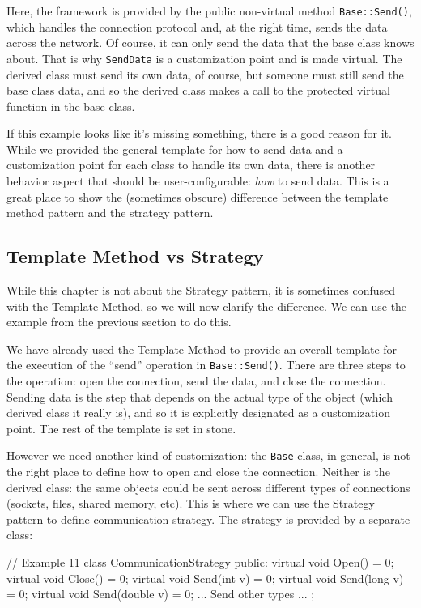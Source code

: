 Here, the framework is provided by the public non-virtual method \texttt{Base::Send()}, which handles the connection protocol and, at the right time, sends the data across the network. Of course, it can only send the data that the base class knows about. That is why \texttt{SendData} is a customization point and is made virtual. The derived class must send its own data, of course, but someone must still send the base class data, and so the derived class makes a call to the protected virtual function in the base class.

If this example looks like it's missing something, there is a good reason for it. While we provided the general template for how to send data and a customization point for each class to handle its own data, there is another behavior aspect that should be user-configurable: \emph{how} to send data. This is a great place to show the (sometimes obscure) difference between the template method pattern and the strategy pattern.

\subsection{Template Method vs Strategy}

While this chapter is not about the Strategy pattern, it is sometimes confused with the Template Method, so we will now clarify the difference. We can use the example from the previous section to do this.

We have already used the Template Method to provide an overall template for the execution of the ``send'' operation in \texttt{Base::Send()}. There are three steps to the operation: open the connection, send the data, and close the connection. Sending data is the step that depends on the actual type of the object (which derived class it really is), and so it is explicitly designated as a customization point. The rest of the template is set in stone.

However we need another kind of customization: the \texttt{Base} class, in general, is not the right place to define how to open and close the connection. Neither is the derived class: the same objects could be sent across different types of connections (sockets, files, shared memory, etc). This is where we can use the Strategy pattern to define communication strategy. The strategy is provided by a separate class:

\begin{code}
// Example 11
class CommunicationStrategy {
  public:
  virtual void Open() = 0;
  virtual void Close() = 0;
  virtual void Send(int v) = 0;
  virtual void Send(long v) = 0;
  virtual void Send(double v) = 0;
  ... Send other types ...
};
\end{code}

